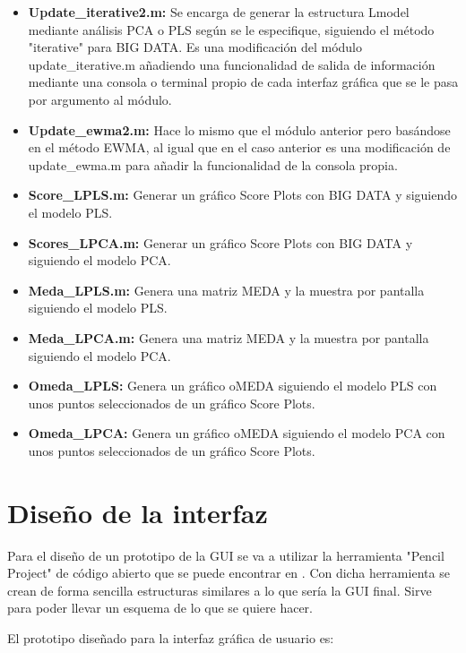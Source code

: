 \begin{itemize}
	\item \textbf{Update\_iterative2.m:} Se encarga de generar la estructura Lmodel mediante análisis PCA o PLS según se le especifique, siguiendo el método "iterative" para BIG DATA. Es una modificación del módulo update\_iterative.m añadiendo una funcionalidad de salida de información mediante una consola o terminal propio de cada interfaz gráfica que se le pasa por argumento al módulo.
	\item \textbf{Update\_ewma2.m:} Hace lo mismo que el módulo anterior pero basándose
en el método EWMA, al igual que en el caso anterior es una modificación de update\_ewma.m para añadir la funcionalidad de la consola propia.
	\item \textbf{Score\_LPLS.m:} Generar un gráfico Score Plots con BIG DATA y siguiendo el modelo PLS.
	\item \textbf{Scores\_LPCA.m:} Generar un gráfico Score Plots con BIG DATA y siguiendo el modelo PCA.
	\item \textbf{Meda\_LPLS.m:} Genera una matriz MEDA y la muestra por pantalla siguiendo el modelo PLS.
	\item \textbf{Meda\_LPCA.m:} Genera una matriz MEDA y la muestra por pantalla siguiendo el modelo PCA.
	\item \textbf{Omeda\_LPLS:} Genera un gráfico oMEDA siguiendo el modelo PLS con unos puntos seleccionados de un gráfico Score Plots.
	\item \textbf{Omeda\_LPCA:} Genera un gráfico oMEDA siguiendo el modelo PCA con unos puntos seleccionados de un gráfico Score Plots.
\end{itemize}

\section{Diseño de la interfaz}

Para el diseño de un prototipo de la GUI se va a utilizar la herramienta "Pencil Project" de código abierto que se puede encontrar en \cite{PE}. Con dicha herramienta se crean de forma sencilla estructuras similares a lo que sería la GUI final. Sirve para poder llevar un esquema de lo que se quiere hacer.

\bigskip

El prototipo diseñado para la interfaz gráfica de usuario es:

